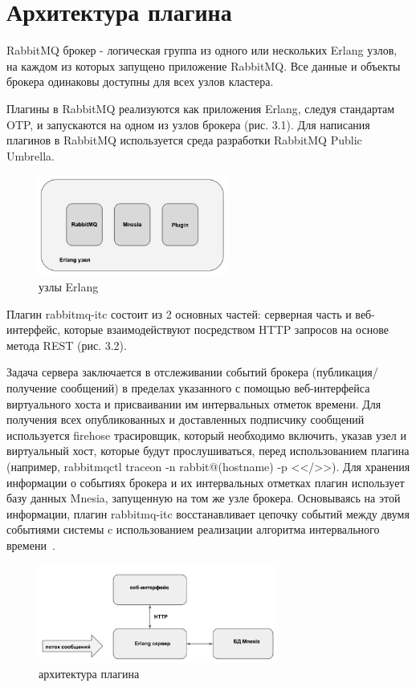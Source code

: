\section{Архитектура плагина}
RabbitMQ брокер - логическая группа из одного или нескольких Erlang узлов, на каждом из которых запущено приложение RabbitMQ. Все данные и объекты брокера одинаковы доступны для всех узлов кластера.\par
Плагины в RabbitMQ реализуются как приложения Erlang, следуя стандартам OTP, и запускаются на одном из узлов брокера (рис. 3.1). Для написания плагинов в RabbitMQ используется среда разработки RabbitMQ Public Umbrella.\par
\begin{figure}
\centering
\includegraphics[width=0.55\textwidth]{img/node.png}
\caption{узлы Erlang}
\end{figure}
Плагин rabbitmq-itc состоит из 2 основных частей: серверная часть и веб-интерфейс, которые взаимодействуют посредством HTTP запросов на основе метода REST (рис. 3.2).\par
Задача сервера заключается в отслеживании событий брокера (публикация/получение сообщений) в пределах указанного с помощью веб-интерфейса  виртуального хоста и присваивании им интервальных отметок времени. Для получения всех опубликованных и доставленных подписчику сообщений используется  firehose трасировщик, который необходимо включить, указав узел и виртуальный хост, которые будут прослушиваться, перед использованием плагина (например, rabbitmqctl trace\underline{\hspace{0.25cm}}on -n rabbit@(hostname) -p <</>>). Для хранения информации о событиях брокера и их интервальных отметках плагин использует базу данных Mnesia, запущенную на том же узле брокера. Основываясь на этой информации, плагин rabbitmq-itc восстанавливает цепочку событий между двумя событиями системы c использованием реализации алгоритма интервального времени~\cite{itc}. \par
\begin{figure}
\centering
\includegraphics[width=0.7\textwidth]{img/struct.png}
\caption{архитектура плагина}
\end{figure}
